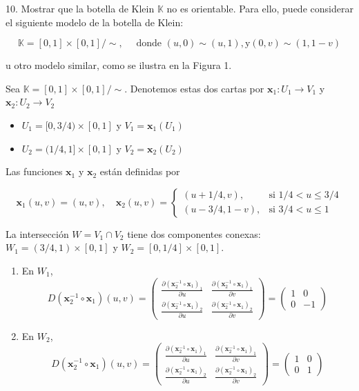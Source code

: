 \begin{problema}
    10. Mostrar que la botella de Klein $\mathbb{K}$ no es orientable. Para ello, puede considerar el siguiente modelo de la botella de Klein:

$$
\mathbb{K}=[0,1] \times[0,1] / \sim, \quad \text { donde }(u, 0) \sim(u, 1), \mathrm{y}(0, v) \sim(1,1-v)
$$

u otro modelo similar, como se ilustra en la Figura 1. 
\begin{dem}
    Sea $\mathbb{K}=[0,1] \times[0,1] / \sim$. Denotemos estas dos cartas por $\mathbf{x}_1: U_1 \rightarrow V_1$ y $\mathbf{x}_2: U_2 \rightarrow V_2$
    \begin{itemize}
        \item $U_1 = [0, 3/4) \times [0,1]$ y $V_1 = \mathbf{x}_1(U_1)$ 
        \item $U_2 = (1/4, 1] \times [0,1]$ y $V_2 = \mathbf{x}_2(U_2)$
    \end{itemize}
    
Las funciones $\mathbf{x}_1$ y $\mathbf{x}_2$ están definidas por

$$ \mathbf{x}_1(u,v) = (u,v), \quad \mathbf{x}_2(u,v) = \left\{\begin{array}{ll} 
    (u+1/4,v), & \text{si } 1/4 < u \leq 3/4 \\
     (u-3/4, 1-v), & \text{si } 3/4 < u \leq 1
 \end{array}\right. $$

La intersección $W = V_1 \cap V_2$ tiene dos componentes conexas: $W_1 = (3/4, 1) \times [0,1]$ y $W_2 = [0, 1/4] \times [0,1]$.
\begin{enumerate}
    \item En $W_1$,
    $$ D(\mathbf{x}_2^{-1} \circ \mathbf{x}_1)(u,v) = \left(\begin{array}{cc} \frac{\partial (\mathbf{x}_2^{-1} \circ \mathbf{x}_1)_1}{\partial u} & \frac{\partial (\mathbf{x}_2^{-1} \circ \mathbf{x}_1)_1}{\partial v} \\ \frac{\partial (\mathbf{x}_2^{-1} \circ \mathbf{x}_1)_2}{\partial u} & \frac{\partial (\mathbf{x}_2^{-1} \circ \mathbf{x}_1)_2}{\partial v} \end{array}\right) = \left(\begin{array}{cc} 1 & 0 \\ 0 & -1 \end{array}\right) $$
    \item En $W_2$,
    $$ D(\mathbf{x}_2^{-1} \circ \mathbf{x}_1)(u,v) = \left(\begin{array}{cc} \frac{\partial (\mathbf{x}_2^{-1} \circ \mathbf{x}_1)_1}{\partial u} & \frac{\partial (\mathbf{x}_2^{-1} \circ \mathbf{x}_1)_1}{\partial v} \\ \frac{\partial (\mathbf{x}_2^{-1} \circ \mathbf{x}_1)_2}{\partial u} & \frac{\partial (\mathbf{x}_2^{-1} \circ \mathbf{x}_1)_2}{\partial v} \end{array}\right) = \left(\begin{array}{cc} 1 & 0 \\ 0 & 1 \end{array}\right) $$
\end{enumerate}


\end{dem}
\end{problema}
